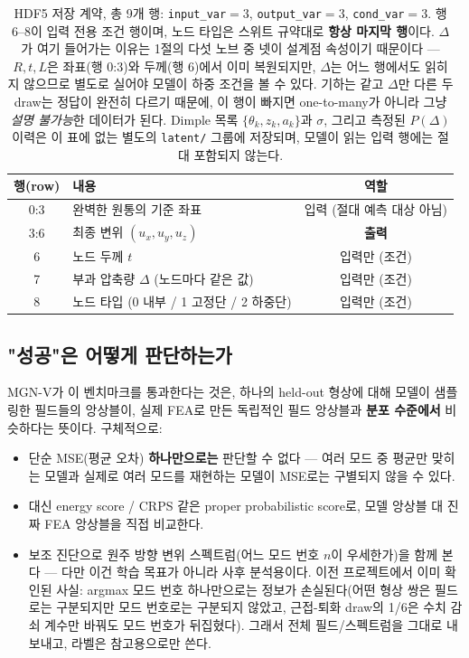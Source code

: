 \documentclass[11pt]{article}
\begin{document}
\begin{table}[h]
\centering
\small
\begin{tabular}{@{}clc@{}}
\toprule
행(row) & 내용 & 역할 \\
\midrule
0:3  & 완벽한 원통의 기준 좌표 & 입력 (절대 예측 대상 아님) \\
3:6  & 최종 변위 $(u_x, u_y, u_z)$ & \textbf{출력} \\
6    & 노드 두께 $t$ & 입력만 (조건) \\
7    & 부과 압축량 $\Delta$ (노드마다 같은 값) & 입력만 (조건) \\
8    & 노드 타입 (0 내부 / 1 고정단 / 2 하중단) & 입력만 (조건) \\
\bottomrule
\end{tabular}
\caption{HDF5 저장 계약, 총 9개 행: \texttt{input\_var}$=3$,
\texttt{output\_var}$=3$, \texttt{cond\_var}$=3$. 행 6--8이 입력 전용 조건
행이며, 노드 타입은 스위트 규약대로 \textbf{항상 마지막 행}이다. $\Delta$가
여기 들어가는 이유는 1절의 다섯 노브 중 넷이 설계점 속성이기 때문이다 ---
$R,t,L$은 좌표(행 0:3)와 두께(행 6)에서 이미 복원되지만, $\Delta$는 어느
행에서도 읽히지 않으므로 별도로 실어야 모델이 하중 조건을 볼 수 있다. 기하는
같고 $\Delta$만 다른 두 draw는 정답이 완전히 다르기 때문에, 이 행이 빠지면
one-to-many가 아니라 그냥 \emph{설명 불가능}한 데이터가 된다. Dimple 목록
$\{\theta_k,z_k,a_k\}$과 $\sigma$, 그리고 측정된 $P(\Delta)$ 이력은 이 표에
없는 별도의 \texttt{latent/} 그룹에 저장되며, 모델이 읽는 입력 행에는 절대
포함되지 않는다.}
\end{table}

\subsection{"성공"은 어떻게 판단하는가}

MGN-V가 이 벤치마크를 통과한다는 것은, 하나의 held-out 형상에 대해 모델이
샘플링한 필드들의 앙상블이, 실제 FEA로 만든 독립적인 필드 앙상블과
\textbf{분포 수준에서} 비슷하다는 뜻이다. 구체적으로:

\begin{itemize}
\item 단순 MSE(평균 오차) \textbf{하나만으로는} 판단할 수 없다 --- 여러 모드 중
      평균만 맞히는 모델과 실제로 여러 모드를 재현하는 모델이 MSE로는
      구별되지 않을 수 있다.
\item 대신 energy score / CRPS 같은 proper probabilistic score로, 모델
      앙상블 대 진짜 FEA 앙상블을 직접 비교한다.
\item 보조 진단으로 원주 방향 변위 스펙트럼(어느 모드 번호 $n$이 우세한가)을
      함께 본다 --- 다만 이건 학습 목표가 아니라 사후 분석용이다. 이전 프로젝트에서
      이미 확인된 사실: argmax 모드 번호 하나만으로는 정보가 손실된다(어떤
      형상 쌍은 필드로는 구분되지만 모드 번호로는 구분되지 않았고, 근접-퇴화
      draw의 1/6은 수치 감쇠 계수만 바꿔도 모드 번호가 뒤집혔다). 그래서 전체
      필드/스펙트럼을 그대로 내보내고, 라벨은 참고용으로만 쓴다.
\end{itemize}
\end{document}
